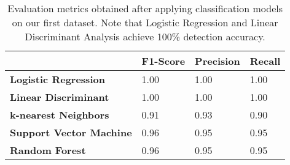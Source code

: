 \documentclass{abmart}
\newcommand{\vs}[1]{{\vspace{-#1mm}}}
\begin{document}
\begin{table}[t]
\small
\begin{center}
\caption{Evaluation metrics obtained after applying classification models on our first dataset. Note that Logistic Regression and Linear Discriminant Analysis achieve 100\% detection accuracy.}

\begin{tabular}{llll}
                                                   & \textbf{F1-Score}         & \textbf{Precision}        & \textbf{Recall}           \\ \hline
\multicolumn{1}{l|}{\textbf{Logistic Regression}} & \multicolumn{1}{l|}{1.00} & \multicolumn{1}{l|}{1.00} & \multicolumn{1}{l}{1.00} \\ \hline
\multicolumn{1}{l|}{\textbf{Linear Discriminant}} & \multicolumn{1}{l|}{1.00} & \multicolumn{1}{l|}{1.00} & \multicolumn{1}{l}{1.00} \\ \hline
\multicolumn{1}{l|}{\textbf{k-nearest Neighbors}} & \multicolumn{1}{l|}{0.91} & \multicolumn{1}{l|}{0.93} & \multicolumn{1}{l}{0.90} \\ \hline
\multicolumn{1}{l|}{\textbf{Support Vector Machine}} & \multicolumn{1}{l|}{0.96} & \multicolumn{1}{l|}{0.95} & \multicolumn{1}{l}{0.95} \\ \hline
\multicolumn{1}{l|}{\textbf{Random Forest}} & \multicolumn{1}{l|}{0.96} & \multicolumn{1}{l|}{0.95} & \multicolumn{1}{l}{0.95} \\ \hline
\end{tabular}
\vs{0}
\label{tab:confusionmatrix}  
\end{center}
\end{table}
\end{document}
